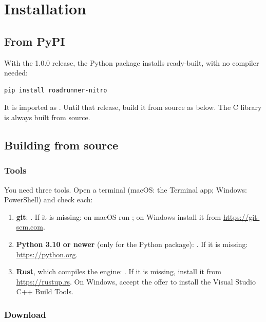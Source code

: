 \chapter{Installation}
\label{ch:installation}

\section{From PyPI}

With the 1.0.0 release, the Python package installs ready-built, with no compiler needed:

\begin{lstlisting}[language=bash]
pip install roadrunner-nitro
\end{lstlisting}

It is imported as . Until that release, build it from source as below. The C library is
always built from source.

\section{Building from source}

\subsection{Tools}

You need three tools. Open a terminal (macOS: the Terminal app; Windows: PowerShell) and check each:

\begin{enumerate}
  \item \textbf{git}: . If it is missing: on macOS run ; on
        Windows install it from \url{https://git-scm.com}.
  \item \textbf{Python 3.10 or newer} (only for the Python package): . If it is missing:
        \url{https://python.org}.
  \item \textbf{Rust}, which compiles the engine: . If it is missing, install it from
        \url{https://rustup.rs}. On Windows, accept the offer to install the Visual Studio C++ Build Tools.
\end{enumerate}

\subsection{Download}

